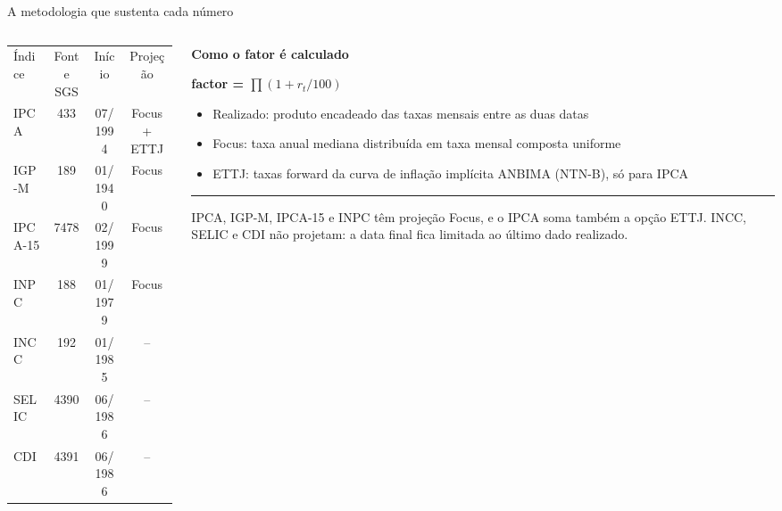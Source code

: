 \documentclass[aspectratio=169, 8pt, t]{beamer}
\begin{document}
\begin{frame}{A metodologia que sustenta cada número}
  \vspace{4mm}
  \begin{columns}[T, onlytextwidth]
    \begin{column}{0.58\textwidth}
      \begin{tabular}{lccc}
        \rowcolor{amNavy}\color{white}Índice & \color{white}Fonte SGS & \color{white}Início & \color{white}Projeção \\
        \rowcolor{amTableStripe}IPCA & 433 & 07/1994 & Focus + ETTJ \\
        IGP-M & 189 & 01/1940 & Focus \\
        \rowcolor{amTableStripe}IPCA-15 & 7478 & 02/1999 & Focus \\
        INPC & 188 & 01/1979 & Focus \\
        \rowcolor{amTableStripe}INCC & 192 & 01/1985 & -- \\
        SELIC & 4390 & 06/1986 & -- \\
        \rowcolor{amTableStripe}CDI & 4391 & 06/1986 & -- \\
      \end{tabular}
    \end{column}
    \begin{column}{0.38\textwidth}
      {\bfseries Como o fator é calculado}\par\vspace{1.5mm}
      {\bfseries\color{amSignal}factor = \(\prod (1+r_t/100)\)}\par\vspace{1.5mm}
      \begin{itemize}
        \item Realizado: produto encadeado das taxas mensais entre as duas datas
        \item Focus: taxa anual mediana distribuída em taxa mensal composta uniforme
        \item ETTJ: taxas forward da curva de inflação implícita ANBIMA (NTN-B), só para IPCA
      \end{itemize}
      \vspace{4mm}\textcolor{amMist}{\rule{0.92\linewidth}{0.3pt}}\vspace{3mm}
      {\amcondlightfont\color{amGray}IPCA, IGP-M, IPCA-15 e INPC têm projeção Focus, e o IPCA soma também a opção ETTJ. INCC, SELIC e CDI não projetam: a data final fica limitada ao último dado realizado.}
    \end{column}
  \end{columns}
\end{frame}
\end{document}
